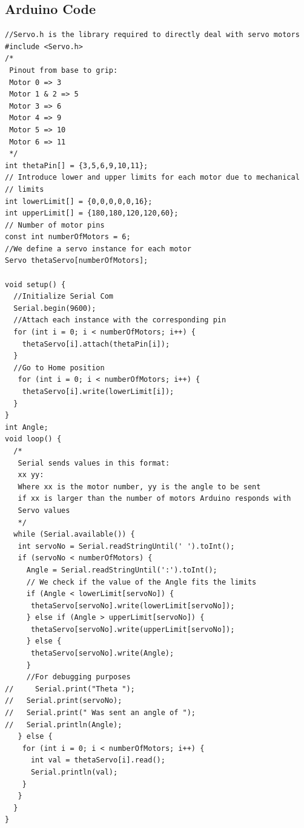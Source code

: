 \documentclass[11pt,a4paper]{report}
\begin{document}
\subsection{Arduino Code}
\label{appendix:arduino}
\begin{lstlisting}
//Servo.h is the library required to directly deal with servo motors
#include <Servo.h>
/*
 Pinout from base to grip:
 Motor 0 => 3
 Motor 1 & 2 => 5
 Motor 3 => 6
 Motor 4 => 9
 Motor 5 => 10
 Motor 6 => 11
 */
int thetaPin[] = {3,5,6,9,10,11};
// Introduce lower and upper limits for each motor due to mechanical
// limits
int lowerLimit[] = {0,0,0,0,0,16};
int upperLimit[] = {180,180,120,120,60};
// Number of motor pins
const int numberOfMotors = 6;
//We define a servo instance for each motor
Servo thetaServo[numberOfMotors];

void setup() {
  //Initialize Serial Com
  Serial.begin(9600);
  //Attach each instance with the corresponding pin
  for (int i = 0; i < numberOfMotors; i++) {
    thetaServo[i].attach(thetaPin[i]);
  }
  //Go to Home position
   for (int i = 0; i < numberOfMotors; i++) {
    thetaServo[i].write(lowerLimit[i]);
  } 
}
int Angle;
void loop() {
  /*
   Serial sends values in this format:
   xx yy:
   Where xx is the motor number, yy is the angle to be sent
   if xx is larger than the number of motors Arduino responds with
   Servo values
   */
  while (Serial.available()) {
   int servoNo = Serial.readStringUntil(' ').toInt();
   if (servoNo < numberOfMotors) {
     Angle = Serial.readStringUntil(':').toInt();
     // We check if the value of the Angle fits the limits
     if (Angle < lowerLimit[servoNo]) {
      thetaServo[servoNo].write(lowerLimit[servoNo]);
     } else if (Angle > upperLimit[servoNo]) {
      thetaServo[servoNo].write(upperLimit[servoNo]);
     } else {
      thetaServo[servoNo].write(Angle);
     }
     //For debugging purposes
//     Serial.print("Theta ");
//   Serial.print(servoNo);
//   Serial.print(" Was sent an angle of ");
//   Serial.println(Angle);
   } else {
    for (int i = 0; i < numberOfMotors; i++) {
      int val = thetaServo[i].read();
      Serial.println(val);
    }
   }
  }
}
\end{lstlisting}
\end{document}
